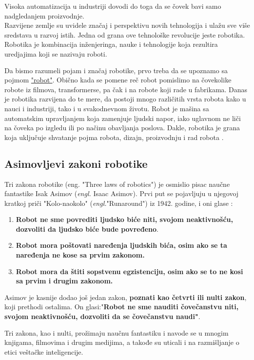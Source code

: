 \documentclass{article}
\begin{document}
	Visoka automatizacija u industriji dovodi do toga da se čovek bavi samo nadgledanjem proizvodnje.\\
	Razvijene zemlje su uvidele značaj i perspektivu novih tehnologija i ulažu sve više sredstava u razvoj istih. Jedna od grana ove tehnološke revolucije jeste robotika. Robotika je kombinacija inženjeringa, nauke i tehnologije koja rezultira uredjajima koji se nazivaju roboti. \cite{robotics2022,robots2022}
	
	
	
	Da bismo razumeli pojam i značaj robotike, prvo treba da se upoznamo sa pojmom \href{https://www.sciencefriday.com/segments/the-origin-of-the-word-robot/}{"robot"}\cite{word robot}.
	Obično kada se pomene reč robot pomislimo na čovekolike robote iz filmova, transformerse, pa čak i na robote koji rade u fabrikama. Danas je robotika razvijena do te mere, da postoji mnogo različitih vrsta robota kako u nauci i industriji, tako i u svakodnevnom životu. Robot je mašina sa automatskim upravljanjem koja zamenjuje ljudski napor, iako uglavnom ne liči na čoveka po izgledu ili po načinu obavljanja poslova. Dakle, robotika je grana koja uključuje shvatanje pojma robota, dizajn, proizvodnju i rad robota \cite{robots in nowdays}.
	
	\subsection{Asimovljevi zakoni robotike}
	Tri zakona robotike (eng. "Three laws of robotics") je osmislio pisac naučne fantastike Isak Asimov (\emph{engl.} Isaac Asimov). Prvi put se pojavljuju u njegovoj kratkoj priči "Kolo-naokolo" (\emph{engl.}"Runaround") iz 1942. godine, i oni glase \cite{three laws of robotics}:
	\begin{enumerate}
	\item \textbf{Robot ne sme povrediti ljudsko biće niti, svojom neaktivnošću, dozvoliti da ljudsko biće bude povređeno}.
	
	\item \textbf{Robot mora poštovati naređenja ljudskih bića, osim ako se ta naređenja ne kose sa prvim zakonom.}
	
	\item \textbf{Robot mora da štiti sopstvenu egzistenciju, osim ako se to ne kosi sa prvim i drugim zakonom.}
	\end{enumerate}
	
	Asimov je kasnije dodao još jedan zakon, \textbf{poznati kao četvrti ili nulti zakon}, koji prethodi ostalima. On glasi:"\textbf{Robot ne sme nauditi čovečanstvu niti, svojom neaktivnošću, dozvoliti da se čovečanstvu naudi"}.\par
	Tri zakona, kao i nulti, prožimaju naučnu fantastiku i navode se u mnogim knjigama, filmovima i drugim medijima, a takođe su uticali i na razmišljanje o etici veštačke inteligencije. \cite{three laws of robotics}
	
\end{document}
